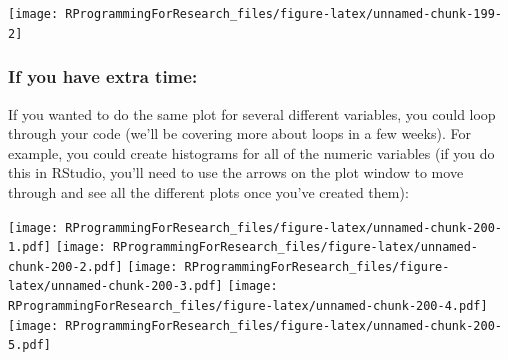 \documentclass[]{book}
\makeatletter
\newenvironment{Shaded}{\begin{snugshade}}{\end{snugshade}}
\newcommand{\KeywordTok}[1]{\textcolor[rgb]{0.13,0.29,0.53}{\textbf{#1}}}
\newcommand{\DataTypeTok}[1]{\textcolor[rgb]{0.13,0.29,0.53}{#1}}
\newcommand{\DecValTok}[1]{\textcolor[rgb]{0.00,0.00,0.81}{#1}}
\newcommand{\StringTok}[1]{\textcolor[rgb]{0.31,0.60,0.02}{#1}}
\newcommand{\ControlFlowTok}[1]{\textcolor[rgb]{0.13,0.29,0.53}{\textbf{#1}}}
\newcommand{\OperatorTok}[1]{\textcolor[rgb]{0.81,0.36,0.00}{\textbf{#1}}}
\newcommand{\NormalTok}[1]{#1}
\newenvironment{kframe}{%
\medskip{}
\setlength{\fboxsep}{.8em}
 \def\at@end@of@kframe{}%
 \ifinner\ifhmode%
  \def\at@end@of@kframe{\end{minipage}}%
  \begin{minipage}{\columnwidth}%
 \fi\fi%
 \def\FrameCommand##1{\hskip\@totalleftmargin \hskip-\fboxsep
 \colorbox{shadecolor}{##1}\hskip-\fboxsep
     \hskip-\linewidth \hskip-\@totalleftmargin \hskip\columnwidth}%
 \MakeFramed {\advance\hsize-\width
   \@totalleftmargin\z@ \linewidth\hsize
   \@setminipage}}%
 {\par\unskip\endMakeFramed%
 \at@end@of@kframe}
\renewenvironment{Shaded}{\begin{kframe}}{\end{kframe}}
\theoremstyle{definition}
\theoremstyle{definition}
\theoremstyle{definition}
\theoremstyle{remark}
\makeatother
\begin{document}
\begin{center}\texttt{[image: RProgrammingForResearch\_files/figure-latex/unnamed-chunk-199-2]} \end{center}

\subsubsection{If you have extra time:}\label{if-you-have-extra-time}

If you wanted to do the same plot for several different variables, you
could loop through your code (we'll be covering more about loops in a
few weeks). For example, you could create histograms for all of the
numeric variables (if you do this in RStudio, you'll need to use the
arrows on the plot window to move through and see all the different
plots once you've created them):

\begin{Shaded}
\end{Shaded}

\texttt{[image: RProgrammingForResearch\_files/figure-latex/unnamed-chunk-200-1.pdf]}
\texttt{[image: RProgrammingForResearch\_files/figure-latex/unnamed-chunk-200-2.pdf]}
\texttt{[image: RProgrammingForResearch\_files/figure-latex/unnamed-chunk-200-3.pdf]}
\texttt{[image: RProgrammingForResearch\_files/figure-latex/unnamed-chunk-200-4.pdf]}
\texttt{[image: RProgrammingForResearch\_files/figure-latex/unnamed-chunk-200-5.pdf]}
\end{document}

